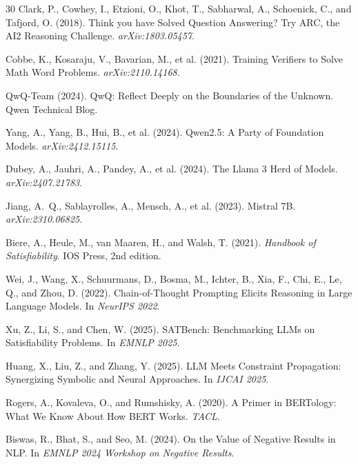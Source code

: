 \documentclass[11pt,a4paper]{article}
\begin{document}
\begin{thebibliography}{30}
Clark, P., Cowhey, I., Etzioni, O., Khot, T., Sabharwal, A., Schoenick, C., and Tafjord, O. (2018).
\newblock Think you have Solved Question Answering? Try ARC, the AI2 Reasoning Challenge.
\newblock \emph{arXiv:1803.05457}.

Cobbe, K., Kosaraju, V., Bavarian, M., et al. (2021).
\newblock Training Verifiers to Solve Math Word Problems.
\newblock \emph{arXiv:2110.14168}.

QwQ-Team (2024).
\newblock QwQ: Reflect Deeply on the Boundaries of the Unknown.
\newblock Qwen Technical Blog.

Yang, A., Yang, B., Hui, B., et al. (2024).
\newblock Qwen2.5: A Party of Foundation Models.
\newblock \emph{arXiv:2412.15115}.

Dubey, A., Jauhri, A., Pandey, A., et al. (2024).
\newblock The Llama 3 Herd of Models.
\newblock \emph{arXiv:2407.21783}.

Jiang, A.~Q., Sablayrolles, A., Mensch, A., et al. (2023).
\newblock Mistral 7B.
\newblock \emph{arXiv:2310.06825}.

Biere, A., Heule, M., van Maaren, H., and Walsh, T. (2021).
\newblock \emph{Handbook of Satisfiability}.
\newblock IOS Press, 2nd edition.

Wei, J., Wang, X., Schuurmans, D., Bosma, M., Ichter, B., Xia, F., Chi, E., Le, Q., and Zhou, D. (2022).
\newblock Chain-of-Thought Prompting Elicits Reasoning in Large Language Models.
\newblock In \emph{NeurIPS 2022}.

Xu, Z., Li, S., and Chen, W. (2025).
\newblock SATBench: Benchmarking LLMs on Satisfiability Problems.
\newblock In \emph{EMNLP 2025}.

Huang, X., Liu, Z., and Zhang, Y. (2025).
\newblock LLM Meets Constraint Propagation: Synergizing Symbolic and Neural Approaches.
\newblock In \emph{IJCAI 2025}.

Rogers, A., Kovaleva, O., and Rumshisky, A. (2020).
\newblock A Primer in BERTology: What We Know About How BERT Works.
\newblock \emph{TACL}.

Biswas, R., Bhat, S., and Seo, M. (2024).
\newblock On the Value of Negative Results in NLP.
\newblock In \emph{EMNLP 2024 Workshop on Negative Results}.

\end{thebibliography}
\end{document}
